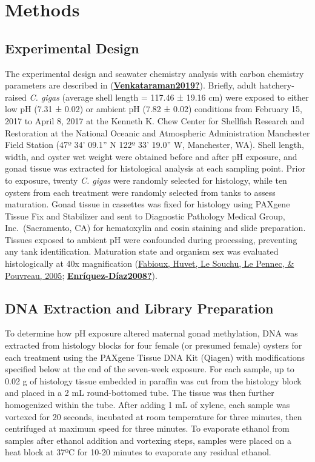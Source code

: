 \documentclass [11pt, proquest] {uwthesis}[2015/03/03]
\begin{document}
\hypertarget{methods-2}{%
\section{Methods}\label{methods-2}}

\hypertarget{experimental-design}{%
\subsection{Experimental Design}\label{experimental-design}}

The experimental design and seawater chemistry analysis with carbon chemistry parameters are described in (\protect\hyperlink{ref-Venkataraman2019}{\textbf{Venkataraman2019?}}). Briefly, adult hatchery-raised \emph{C. gigas} (average shell length = 117.46 ± 19.16 cm) were exposed to either low pH (7.31 ± 0.02) or ambient pH (7.82 ± 0.02) conditions from February 15, 2017 to April 8, 2017 at the Kenneth K. Chew Center for Shellfish Research and Restoration at the National Oceanic and Atmospheric Administration Manchester Field Station (47º 34' 09.1'' N 122º 33' 19.0'' W, Manchester, WA). Shell length, width, and oyster wet weight were obtained before and after pH exposure, and gonad tissue was extracted for histological analysis at each sampling point. Prior to exposure, twenty \emph{C. gigas} were randomly selected for histology, while ten oysters from each treatment were randomly selected from tanks to assess maturation. Gonad tissue in cassettes was fixed for histology using PAXgene Tissue Fix and Stabilizer and sent to Diagnostic Pathology Medical Group, Inc.~(Sacramento, CA) for hematoxylin and eosin staining and slide preparation. Tissues exposed to ambient pH were confounded during processing, preventing any tank identification. Maturation state and organism sex was evaluated histologically at 40x magnification (\protect\hyperlink{ref-Fabioux2005}{Fabioux, Huvet, Le Souchu, Le Pennec, \& Pouvreau, 2005}; \protect\hyperlink{ref-Enruxedquez-Duxedaz2008}{\textbf{Enríquez-Díaz2008?}}).

\hypertarget{dna-extraction-and-library-preparation}{%
\subsection{DNA Extraction and Library Preparation}\label{dna-extraction-and-library-preparation}}

To determine how pH exposure altered maternal gonad methylation, DNA was extracted from histology blocks for four female (or presumed female) oysters for each treatment using the PAXgene Tissue DNA Kit (Qiagen) with modifications specified below at the end of the seven-week exposure. For each sample, up to 0.02 g of histology tissue embedded in paraffin was cut from the histology block and placed in a 2 mL round-bottomed tube. The tissue was then further homogenized within the tube. After adding 1 mL of xylene, each sample was vortexed for 20 seconds, incubated at room temperature for three minutes, then centrifuged at maximum speed for three minutes. To evaporate ethanol from samples after ethanol addition and vortexing steps, samples were placed on a heat block at 37ºC for 10-20 minutes to evaporate any residual ethanol.
\end{document}
